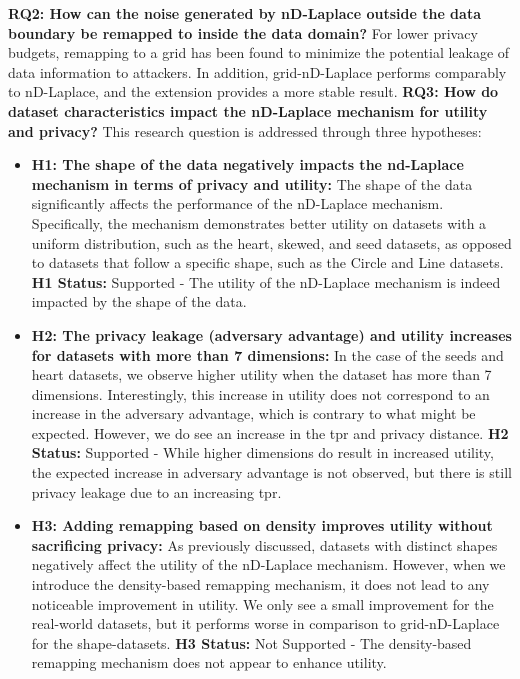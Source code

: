 \textbf{RQ2: How can the noise generated by nD-Laplace outside the data boundary be remapped to inside the data domain?} \newline
For lower privacy budgets, remapping to a grid has been found to minimize the potential leakage of data information to attackers.
In addition, grid-nD-Laplace performs comparably to nD-Laplace, and the extension provides a more stable result. \newline
\textbf{RQ3: How do dataset characteristics impact the nD-Laplace mechanism for utility and privacy?} \newline
This research question is addressed through three hypotheses:
\begin{itemize}
	\item \textbf{H1: The shape of the data negatively impacts the nd-Laplace mechanism in terms of privacy and utility:}
	The shape of the data significantly affects the performance of the nD-Laplace mechanism. Specifically, the mechanism demonstrates better utility on datasets with a uniform distribution, such as the heart, skewed, and seed datasets, as opposed to datasets that follow a specific shape, such as the Circle and Line datasets. \newline  
    \textbf{H1 Status:} Supported - The utility of the nD-Laplace mechanism is indeed impacted by the shape of the data.
	\item \textbf{H2: The privacy leakage (adversary advantage) and utility increases for datasets with more than 7 dimensions:}
	      In the case of the seeds and heart datasets, we observe higher utility when the dataset has more than 7 dimensions. Interestingly, this increase in utility does not correspond to an increase in the adversary advantage, which is contrary to what might be expected. However, we do see an increase in the \gls{tpr} and privacy distance. \newline \textbf{H2 Status:} Supported - While higher dimensions do result in increased utility, the expected increase in adversary advantage is not observed, but there is still privacy leakage due to an increasing \gls{tpr}.
	\item \textbf{H3: Adding remapping based on density improves utility without sacrificing privacy:}
	     As previously discussed, datasets with distinct shapes negatively affect the utility of the nD-Laplace mechanism. However, when we introduce the density-based remapping mechanism, it does not lead to any noticeable improvement in utility. We only see a small improvement for the real-world datasets, but it performs worse in comparison to grid-nD-Laplace for the shape-datasets. \newline \textbf{H3 Status:} Not Supported - The density-based remapping mechanism does not appear to enhance utility.
\end{itemize}

